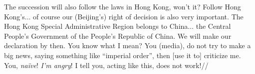\glb
{The succession} {will also} {follow} {the laws in Hong Kong,} {won't it?} {Follow} {Hong Kong's$\ldots$} {of course} {our (Beijing's) right of decision} {is also} {very} {important.} {The Hong Kong Special Administrative Region} {belongs to} {China$\ldots$} {the Central People's Government of the People's Republic of China.} {We will make our declaration by then.} {You know what I mean?} {You (media),} {do not try to} {make a} {big news,} {saying something like} {``imperial order'',} {then [use it to] criticize me.} {You,} {\textit{na\"{i}ve}!} {\textit{I'm angry}!} {I tell you,} {acting like this,} {does not work!}//
\endgl
\xe



